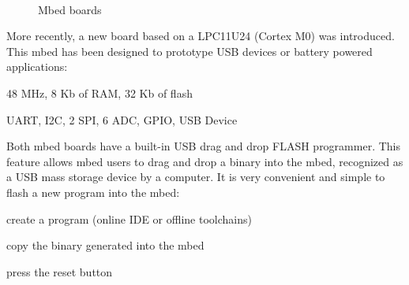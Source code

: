 \documentclass[pdftex,10pt,a4paper]{report}
\newenvironment{packed_item}{
\begin{itemize}
  \setlength{\itemsep}{1pt}
  \setlength{\parskip}{0pt}
  \setlength{\parsep}{0pt}
}{\end{itemize}}
\begin{document}
\begin{figure}[htp]
  \centering
   \\
  \caption{Mbed boards}
  \label{fig:contour}
\end{figure}

More recently, a new board based on a LPC11U24 (Cortex M0) was introduced. This mbed has been designed to prototype USB devices or battery powered applications:
\begin{packed_item}
	\item 48 MHz, 8 Kb of RAM, 32 Kb of flash
	\item UART, I2C, 2 SPI, 6 ADC, GPIO, USB Device
\end{packed_item}


Both mbed boards have a built-in USB drag and drop FLASH programmer. This feature allows mbed users to drag and drop a binary into the mbed, recognized as a USB mass storage device by a computer. It is very convenient and simple to flash a new program into the mbed:
\begin{packed_item}
	\item create a program (online IDE or offline toolchains)
	\item copy the binary generated into the mbed 
	\item press the reset button
\end{packed_item}
\end{document}

